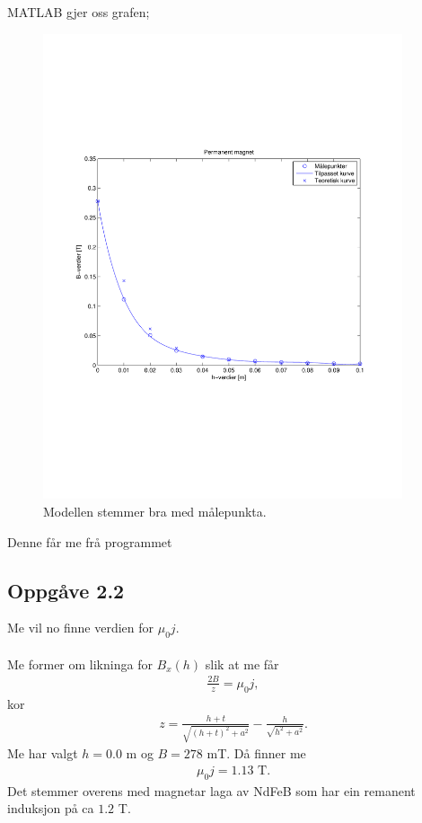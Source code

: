 \documentclass[11pt, a4paper]{article}
\begin{document}
    MATLAB gjer oss grafen;
    \begin{figure}[H]
      \centering
      \includegraphics[width=400px]{Oppgave21.pdf}
      \caption{Modellen stemmer bra med målepunkta.}
    \end{figure}

    Denne får me frå programmet
    

  \subsection*{Oppgåve 2.2}
    Me vil no finne verdien for $\mu_0 j$. \\ \\
    Me former om likninga for $B_{x}(h)$ slik at me får
    \begin{align*}
      \frac{2B}{z} = \mu_0j,
    \end{align*}
    kor
    \begin{align*}
      z = \frac{h + t}{\sqrt{(h + t)^2 + a^2}} - \frac{h}{\sqrt{h^2 + a^2}}.
    \end{align*}
    Me har valgt $h = 0.0$ m og $B = 278$ mT.
    Då finner me
    \begin{align*}
      \mu_0 j = 1.13 \text{ T}.
    \end{align*}
    Det stemmer overens med magnetar laga av NdFeB som har ein remanent induksjon på ca $1.2$ T.
\end{document}
